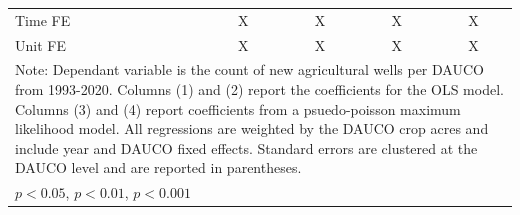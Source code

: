 \begin{table}[htbp]
\begin{tabular}{l*{4}{c}}
Time FE             &           X         &           X         &           X         &           X         \\
Unit FE             &           X         &           X         &           X         &           X         \\
\hline\hline
\multicolumn{5}{l}{\footnotesize Note: Dependant variable is the count of new agricultural wells per DAUCO from 1993-2020. Columns (1) and (2) report the coefficients for the OLS model. Columns (3) and (4) report coefficients from a psuedo-poisson maximum likelihood model. All regressions are weighted by the DAUCO crop acres and include year and DAUCO fixed effects. Standard errors are clustered at the DAUCO level and are reported in parentheses.}\\
\multicolumn{5}{l}{\footnotesize \sym{*} \(p<0.05\), \sym{**} \(p<0.01\), \sym{***} \(p<0.001\)}\\
\end{tabular}
\end{table}
